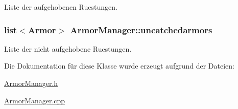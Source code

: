 Liste der aufgehobenen Ruestungen. 

\hypertarget{class_armor_manager_ae6bec783f6c8214faf838f831c130e99}{
\subsubsection[{uncatchedarmors}]{\setlength{\rightskip}{0pt plus 5cm}list$<${\bf Armor}$>$ Armor\-Manager\-::uncatchedarmors\hspace{0.3cm}{\ttfamily [private]}}}\label{class_armor_manager_ae6bec783f6c8214faf838f831c130e99}


Liste der nicht aufgehobene Ruestungen. 



Die Dokumentation für diese Klasse wurde erzeugt aufgrund der Dateien\-:\begin{DoxyCompactItemize}
\item 
\hyperlink{_armor_manager_8h}{Armor\-Manager.\-h}\item 
\hyperlink{_armor_manager_8cpp}{Armor\-Manager.\-cpp}\end{DoxyCompactItemize}

